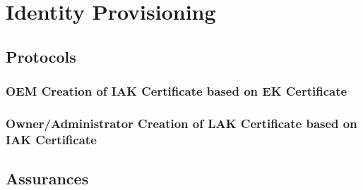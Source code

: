 \chapter{Identity Provisioning}

\section{Protocols}

\subsection{OEM Creation of IAK Certificate based on EK Certificate}



\subsection{Owner/Administrator Creation of LAK Certificate based on IAK Certificate}

\section{Assurances}